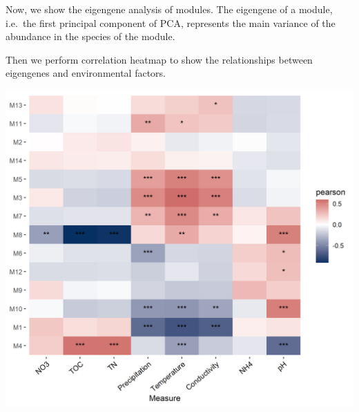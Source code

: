 \documentclass[
]{book}
\newenvironment{Shaded}{\begin{snugshade}}{\end{snugshade}}
\newcommand{\AttributeTok}[1]{\textcolor[rgb]{0.77,0.63,0.00}{#1}}
\newcommand{\CommentTok}[1]{\textcolor[rgb]{0.56,0.35,0.01}{\textit{#1}}}
\newcommand{\DecValTok}[1]{\textcolor[rgb]{0.00,0.00,0.81}{#1}}
\newcommand{\FunctionTok}[1]{\textcolor[rgb]{0.00,0.00,0.00}{#1}}
\newcommand{\NormalTok}[1]{#1}
\newcommand{\OtherTok}[1]{\textcolor[rgb]{0.56,0.35,0.01}{#1}}
\newcommand{\SpecialCharTok}[1]{\textcolor[rgb]{0.00,0.00,0.00}{#1}}
\begin{document}
Now, we show the eigengene analysis of modules.
The eigengene of a module, i.e.~the first principal component of PCA, represents the main variance of the abundance in the species of the module.

\begin{Shaded}
\end{Shaded}

Then we perform correlation heatmap to show the relationships between eigengenes and environmental factors.

\begin{Shaded}
\end{Shaded}

\begin{center}\includegraphics[width=600px]{Images/Env_module_eigen} \end{center}
\end{document}
